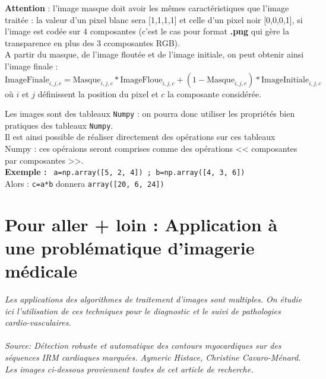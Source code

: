 \textbf{Attention} : l'image masque doit avoir les mêmes caractéristiques que l'image traitée : la valeur d'un pixel blanc sera [1,1,1,1] et celle d'un pixel noir [0,0,0,1], si l'image est codée sur 4 composantes (c'est le cas pour format \textbf{.png} qui gère la transparence en plus des 3 ccomposantes RGB).\\

A partir du masque, de l'image floutée et de l'image initiale, on peut obtenir ainsi l'image finale :
\begin{equation}
\text{ImageFinale}_{i,j,c} = \text{Masque}_{i,j,c} * \text{ImageFloue}_{i,j,c}  + (1-\text{Masque}_{i,j,c})*\text{ImageInitiale}_{i,j,c}   
\end{equation} 
où $i$ et $j$ définissent la position du pixel et $c$ la composante considérée.


\begin{rem}
Les images sont des tableaux \texttt{Numpy} : on pourra donc utiliser les propriétés bien pratiques des tableaux \texttt{Numpy}.\\
Il est ainsi possible de réaliser directement des opérations sur ces tableaux Numpy :  ces opéraions seront comprises comme des opérations << composantes par composantes >>.\\
\textbf{Exemple :} \texttt{ a=np.array([5, 2, 4]) ; b=np.array([4, 3, 6])}     \\
       Alors  : \texttt{c=a*b} donnera \texttt{array([20, 6, 24])} 

\end{rem}


\section{Pour aller + loin : Application à une problématique d'imagerie médicale}



\textit{
Les applications des algorithmes de traitement d'images sont multiples. On étudie ici l'utilisation de ces techniques pour le diagnostic et le suivi de pathologies cardio-vasculaires.}\\
\\
\textit{Source: Détection robuste et automatique des contours myocardiques sur des séquences IRM cardiaques marquées. Aymeric Histace, Christine Cavaro-Ménard. Les images ci-dessous proviennent toutes de cet article de recherche.}


